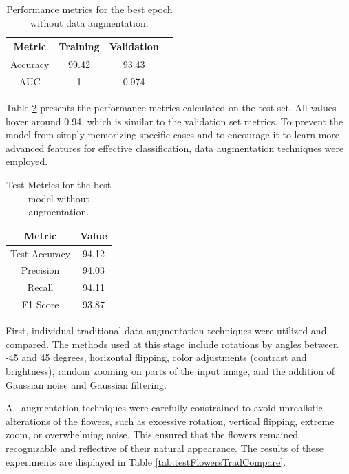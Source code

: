 \begin{table}[h]
    \centering
    \caption{Performance metrics for the best epoch without data augmentation.}
    \begin{tabular}{|c|c|c|c|}
        \hline
        \textbf{Metric} & \textbf{Training} & \textbf{Validation}   \\ \hline
        Accuracy & 99.42 & 93.43 \\ \hline
        AUC & 1 & 0.974  \\ \hline
    \end{tabular}
    \label{tab:flowersNoAug}
\end{table}

Table \ref{tab:testFlowersNoAug} presents the performance metrics calculated on the test set. All values hover around 0.94, which is similar to the validation set metrics. To prevent the model from simply memorizing specific cases and to encourage it to learn more advanced features for effective classification, data augmentation techniques were employed.

\begin{table}[h]
    \centering
    \caption{Test Metrics for the best model without augmentation.}
    \label{tab:testFlowersNoAug}
    \begin{tabular}{|c|c|}
        \hline
        \textbf{Metric} & \textbf{Value} \\
        \hline
        Test Accuracy & 94.12 \\
        Precision & 94.03 \\
        Recall & 94.11 \\
        F1 Score & 93.87 \\
        \hline
    \end{tabular}
\end{table}

First, individual traditional data augmentation techniques were utilized and compared. The methods used at this stage include rotations by angles between -45 and 45 degrees, horizontal flipping, color adjustments (contrast and brightness), random zooming on parts of the input image, and the addition of Gaussian noise and Gaussian filtering. 

All augmentation techniques were carefully constrained to avoid unrealistic alterations of the flowers, such as excessive rotation, vertical flipping, extreme zoom, or overwhelming noise. This ensured that the flowers remained recognizable and reflective of their natural appearance. The results of these experiments are displayed in Table \ref{tab:testFlowersTradCompare}.

